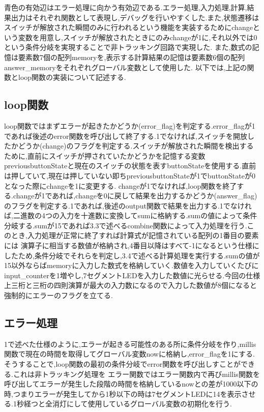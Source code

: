\documentclass[dvipdfmx]{jarticle}
\begin{document}
    青色の有効辺はエラー処理に向かう有効辺である.エラー処理,入力処理,計算,結果出力はそれぞれ関数として表現し,デバッグを行いやすくした.また,状態遷移はスイッチが解放された瞬間のみに行われるという機能を実装するためにchangeという変数を用意し,スイッチが解放されたときにのみchangeが1に,それ以外では0という条件分岐を実現することで非トラッキング回路で実現した.
    また,数式の記憶は要素数7個の配列memoryを,表示する計算結果の記憶は要素数6個の配列answer\_memoryをそれぞれグローバル変数として使用した.
    以下では,上記の関数とloop関数の実装について記述する.
    \subsection{loop関数}
    loop関数ではまずエラーが起きたかどうか(error\_flag)を判定する.error\_flagが1であれば後述のerror関数を呼び出して終了する.1でなければ,スイッチを開放したかどうか(change)のフラグを判定する.スイッチが解放された瞬間を検出するために,直前にスイッチが押されていたかどうかを記憶する変数previousbuttonStateと現在のスイッチの状態を表すbuttonStateを使用する.直前は押していて,現在は押していない即ちpreviousbuttonStateが1でbuttonStateが0となった際にchangeを1に変更する.
    changeが1でなければ,loop関数を終了する.changeが1であれば,changeを0に戻して結果を出力するかどうか(answer\_flag)のフラグを判定する.1であれば,後述のoutput関数で結果を出力する.1でなければ,二進数の4つの入力を十進数に変換してsumに格納する.sumの値によって条件分岐する.sumが15であれば3.3で述べるcombine関数によって入力処理を行う.このとき,入力処理が正常に終了すれば計算式が記憶されている配列の1番目の要素には
    演算子に相当する数値が格納され,4番目以降はすべて-1になるという仕様にしたため,条件分岐でそれらを判定し,3.4で述べる計算処理を実行する.sumの値が15以外ならばmemoryに入力した数式を格納していく.数値を入力していくたびにinput\_counterを1増やし,7セグメントLEDを入力した数値に光らせる.今回の仕様上三桁と三桁の四則演算が最大の入力数になるので入力した数値が8個になると強制的にエラーのフラグを立てる.
    \subsection{エラー処理}
    1で述べた仕様のように,エラーが起きる可能性のある所に条件分岐を作り,millis関数で現在の時間を取得してグローバル変数nowに格納し,error\_flagを1にする.そうすることで,loop関数の最初の条件分岐でerror関数を呼び出しすことができる.これは非トラッキング処理を
    エラー関数ではエラー関数内で再びmillis関数を呼び出してエラーが発生した段階の時間を格納しているnowとの差が1000以下の時,つまりエラーが発生してから1秒以下の時は7セグメントLEDに14を表示させる.1秒経つと全消灯にして使用しているグローバル変数の初期化を行う.
\end{document}
